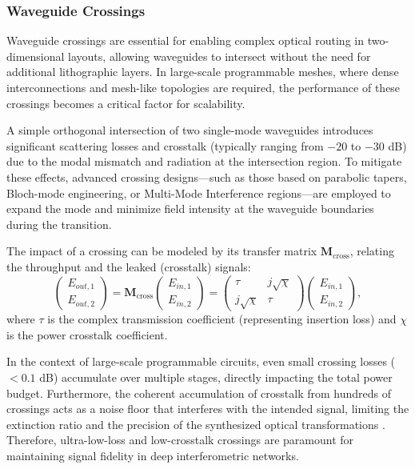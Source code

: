 \FloatBarrier



\subsubsection*{Waveguide Crossings}

Waveguide crossings are essential for enabling complex optical routing in two-dimensional layouts, 
allowing waveguides to intersect without the need for additional lithographic layers. In 
large-scale programmable meshes, where dense interconnections and mesh-like topologies are 
required, the performance of these crossings becomes a critical factor for scalability.

A simple orthogonal intersection of two single-mode waveguides introduces significant scattering 
losses and crosstalk (typically ranging from $-20$ to $-30$ dB) due to the modal mismatch and 
radiation at the intersection region. To mitigate these effects, advanced crossing designs—such as 
those based on parabolic tapers, Bloch-mode engineering, or Multi-Mode Interference regions—are 
employed to expand the mode and minimize field intensity at the waveguide boundaries during the 
transition.

The impact of a crossing can be modeled by its transfer matrix $\mathbf{M}_{\text{cross}}$, 
relating the throughput and the leaked (crosstalk) signals:
\begin{equation}
\begin{pmatrix} E_{out,1} \\ E_{out,2} \end{pmatrix} = \mathbf{M}_{\text{cross}} \begin{pmatrix} 
    E_{in,1} \\ E_{in,2} \end{pmatrix} = \begin{pmatrix} \tau & j\sqrt{\chi} \\ j\sqrt{\chi} & \tau 
    \end{pmatrix} \begin{pmatrix} E_{in,1} \\ E_{in,2} \end{pmatrix},
\label{eq:matrix_crossing}
\end{equation}
where $\tau$ is the complex transmission coefficient (representing insertion loss) and $\chi$ is 
the power crosstalk coefficient. 

In the context of large-scale programmable circuits, even small crossing losses ($<0.1$ dB) 
accumulate over multiple stages, directly impacting the total power budget. Furthermore, the 
coherent accumulation of crosstalk from hundreds of crossings acts as a noise floor that 
interferes with the intended signal, limiting the extinction ratio and the precision of the 
synthesized optical transformations \cite{maUltralowLossSingle2013}. Therefore, ultra-low-loss 
and low-crosstalk crossings are paramount for maintaining signal fidelity in deep interferometric 
networks.


